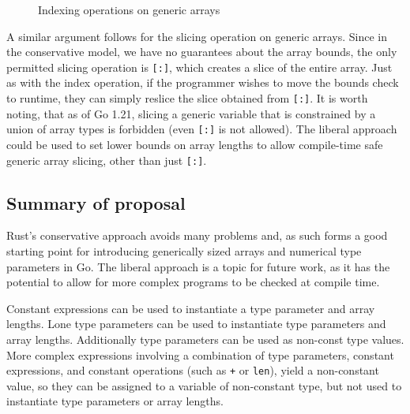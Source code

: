 \begin{figure}
    \caption{Indexing operations on generic arrays}
\end{figure}

A similar argument follows for the slicing operation on generic arrays. Since in
the conservative model, we have no guarantees about the array bounds, the only
permitted slicing operation is \texttt{[:]}, which creates a slice of the entire
array. Just as with the index operation, if the programmer wishes to move the
bounds check to runtime, they can simply reslice the slice obtained from
\texttt{[:]}. It is worth noting, that as of Go 1.21, slicing a generic variable
that is constrained by a union of array types is forbidden (even \texttt{[:]} is
not allowed). The liberal approach could be used to set lower bounds on array
lengths to allow compile-time safe generic array slicing, other than just
\texttt{[:]}.

\subsection{Summary of proposal}

Rust's conservative approach avoids many problems and, as such forms a good
starting point for introducing generically sized arrays and numerical type
parameters in Go. The liberal approach is a topic for future work, as it has the
potential to allow for more complex programs to be checked at compile time.

Constant expressions can be used to instantiate a  type parameter and
array lengths. Lone  type parameters can be used to instantiate
 type parameters and array lengths. Additionally  type
parameters can be used as non-const  type values. More complex
expressions involving a combination of type parameters, constant expressions,
and constant operations (such as \texttt{+} or \texttt{len}), yield a
non-constant  value, so they can be assigned to a variable of
non-constant  type, but not used to instantiate  type
parameters or array lengths.
